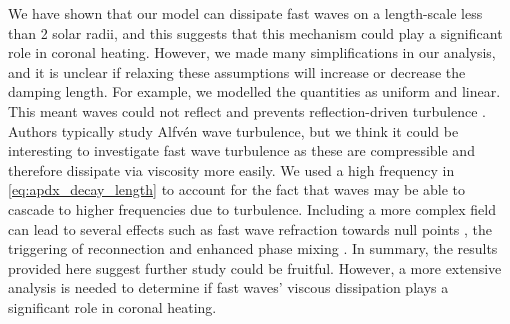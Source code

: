We have shown that our model can dissipate fast waves on a length-scale less than 2 solar radii, and this suggests that this mechanism could play a significant role in coronal heating. However, we made many simplifications in our analysis, and it is unclear if relaxing these assumptions will increase or decrease the damping length. For example, we modelled the quantities as uniform and linear. This meant waves could not reflect and prevents reflection-driven turbulence \citep{Hollweg1986a,vanBallegooijen2011,Shoda2019}. Authors typically study Alfv\'en wave turbulence, but we think it could be interesting to investigate fast wave turbulence as these are compressible and therefore dissipate via viscosity more easily. We used a high frequency in \eqref{eq:apdx_decay_length} to account for the fact that waves may be able to cascade to higher frequencies due to turbulence. Including a more complex field can lead to several effects such as fast wave refraction towards null points \citep{McLaughlin2006,McLaughlin2011,McLaughlin2016}, the triggering of reconnection \citep{McLaughlin2009} and enhanced phase mixing \citep{Similon1989,Howson2020a}. In summary, the results provided here suggest further study could be fruitful. However,  a more extensive analysis is needed to determine if fast waves' viscous dissipation plays a significant role in coronal heating.